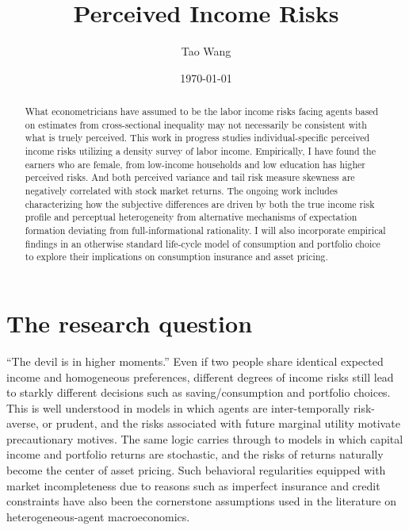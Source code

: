 \documentclass[12pt,notitlepage,onecolumn,aps,pra]{article}
\begin{document}
    
    
    \title{Perceived Income Risks}\author{Tao Wang}

\date{\today}
\maketitle\begin{abstract}What econometricians have assumed to be the labor income risks facing agents based on estimates from cross-sectional inequality may not necessarily be consistent with what is truely perceived.  This work in progress studies individual-specific perceived income risks utilizing a density survey of labor income. Empirically, I have found the earners who are female, from low-income households and low education has higher perceived risks. And both perceived variance and tail risk measure skewness are negatively correlated with stock market returns. The ongoing work includes characterizing how the subjective differences are driven by both the true income risk profile and perceptual heterogeneity from alternative mechanisms of expectation formation deviating from full-informational rationality. I will also incorporate empirical findings in an otherwise standard life-cycle model of consumption and portfolio choice to explore their implications on consumption insurance and asset pricing.\end{abstract}


    
    

    
    \hypertarget{the-research-question}{%
\section{The research question}\label{the-research-question}}

``The devil is in higher moments.'' Even if two people share identical
expected income and homogeneous preferences, different degrees of income
risks still lead to starkly different decisions such as
saving/consumption and portfolio choices. This is well understood in
models in which agents are inter-temporally risk-averse, or prudent, and
the risks associated with future marginal utility motivate precautionary
motives. The same logic carries through to models in which capital
income and portfolio returns are stochastic, and the risks of returns
naturally become the center of asset pricing. Such behavioral
regularities equipped with market incompleteness due to reasons such as
imperfect insurance and credit constraints have also been the
cornerstone assumptions used in the literature on heterogeneous-agent
macroeconomics.
\end{document}
